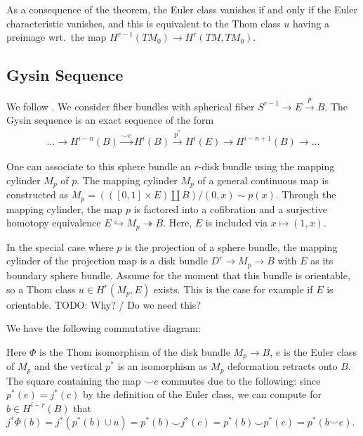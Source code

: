 \documentclass{scrartcl}
\theoremstyle{plain}
\theoremstyle{definition}
\newcommand{\cupp}{\mathbin{\smile}}
\newcommand{\iso}{\cong}
\newcommand{\injto}{\hookrightarrow}
\newcommand{\surjto}{\twoheadrightarrow}
\DeclareMathOperator{\id}{id}
\renewcommand{\coprod}{\mathbin{\amalg}}
\begin{document}
As a consequence of the theorem, the Euler class vanishes if and only if the Euler characteristic vanishes, and this is equivalent to the Thom class $u$ having a preimage wrt.\ the map $H^{r-1}(TM_0) \to H^r(TM, TM_0)$.

\subsection{Gysin Sequence}\label{subsec:gysin_sequence}
We follow \cite[pp. 438]{hatcher2002algebraic}. We consider fiber bundles with spherical fiber $S^{r-1}\to E\xrightarrow{p} B$. The Gysin sequence is an exact sequence of the form 
\begin{align*}
    \dots \to H^{i-n}(B) \xrightarrow{\cupp e} H^i(B) \xrightarrow{p^*} H^i(E) \to H^{i-n+1}(B)\to \dots
\end{align*}

One can associate to this sphere bundle an $r$-disk bundle using the mapping  cylinder $M_p$ of $p$. The mapping cylinder $M_p$ of a general continuous map is constructed as $M_p = (([0, 1]\times E) \coprod B) / (0, x) \sim p(x)$. Through the mapping cylinder, the map $p$ is factored into a cofibration and a surjective homotopy equivalence $E \injto M_p \surjto B$. Here, $E$ is included via $x\mapsto (1, x)$. 

In the special case where $p$ is the projection of a sphere bundle, the mapping cylinder of the projection map is a disk bundle $D^r\to M_p \to B$ with $E$ as its boundary sphere bundle. Assume for the moment that this bundle is orientable, so a Thom class $u\in H^r(M_p, E)$ exists. This is the case for example if $E$ is orientable. TODO: Why? / Do we need this?

We have the following commutative diagram: 


Here $\Phi$ is the Thom isomorphism of the disk bundle $M_p\to B$, $e$ is the Euler class of $M_p$ and the vertical $p^*$ is an isomorphism as $M_p$ deformation retracts onto $B$. The square containing the map $\cupp e$ commutes due to the following: since $p^*(e) = j^*(c)$ by the definition of the Euler class, we can compute for $b\in H^{i-r}(B)$ that $j^*\Phi(b) = j^*(p^*(b)\cup u) = p^*(b) \cupp j^*(c) = p^*(b) \cupp p^*(e) = p^*(b\cupp e)$. 
\end{document}
